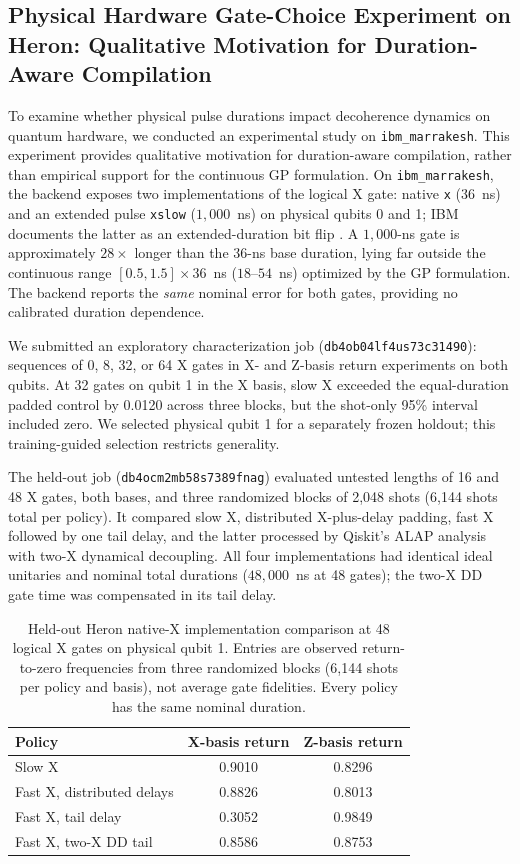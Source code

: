 \documentclass[10pt,letterpaper,journal]{IEEEtran}
\begin{document}
\subsection{Physical Hardware Gate-Choice Experiment on Heron: Qualitative Motivation for Duration-Aware Compilation}
To examine whether physical pulse durations impact decoherence dynamics on quantum hardware, we conducted an experimental study on \texttt{ibm\_marrakesh}. This experiment provides qualitative motivation for duration-aware compilation, rather than empirical support for the continuous GP formulation. On \texttt{ibm\_marrakesh}, the backend exposes two implementations of the logical X gate: native \texttt{x} ($36$~ns) and an extended pulse \texttt{xslow} ($1{,}000$~ns) on physical qubits 0 and 1; IBM documents the latter as an extended-duration bit flip \cite{ibm_xslow}. A $1{,}000$-ns gate is approximately $28\times$ longer than the $36$-ns base duration, lying far outside the continuous range $[0.5, 1.5]\times 36$~ns ($18\text{--}54$~ns) optimized by the GP formulation. The backend reports the \emph{same} nominal error for both gates, providing no calibrated duration dependence.

We submitted an exploratory characterization job (\texttt{db4ob04lf4us73c31490}): sequences of 0, 8, 32, or 64 X gates in X- and Z-basis return experiments on both qubits. At 32 gates on qubit 1 in the X basis, slow X exceeded the equal-duration padded control by 0.0120 across three blocks, but the shot-only 95\% interval included zero. We selected physical qubit 1 for a separately frozen holdout; this training-guided selection restricts generality.

The held-out job (\texttt{db4ocm2mb58s7389fnag}) evaluated untested lengths of 16 and 48 X gates, both bases, and three randomized blocks of 2,048 shots (6,144 shots total per policy). It compared slow X, distributed X-plus-delay padding, fast X followed by one tail delay, and the latter processed by Qiskit's ALAP analysis with two-X dynamical decoupling. All four implementations had identical ideal unitaries and nominal total durations ($48{,}000$~ns at 48 gates); the two-X DD gate time was compensated in its tail delay.

\begin{table}[t]
\centering\caption{Held-out Heron native-X implementation comparison at 48 logical X gates on physical qubit 1. Entries are observed return-to-zero frequencies from three randomized blocks (6,144 shots per policy and basis), not average gate fidelities. Every policy has the same nominal duration.}\label{tab:x_duration_hardware}
\begin{tabular}{lcc}\hline
Policy & X-basis return & Z-basis return\\\hline
Slow X & 0.9010 & 0.8296\\
Fast X, distributed delays & 0.8826 & 0.8013\\
Fast X, tail delay & 0.3052 & 0.9849\\
Fast X, two-X DD tail & 0.8586 & 0.8753\\\hline
\end{tabular}
\end{table}
\end{document}

